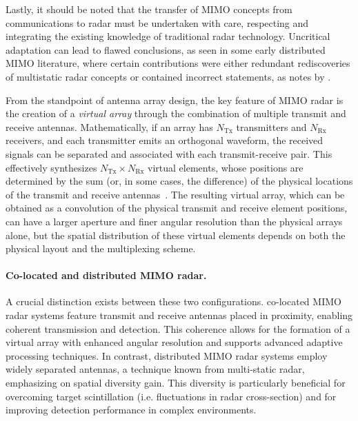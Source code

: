 Lastly, it should be noted that the transfer of MIMO concepts from communications to radar must be undertaken with care, respecting and integrating the existing knowledge of traditional radar technology.
Uncritical adaptation can lead to flawed conclusions, as seen in some early distributed MIMO literature, where certain contributions were either redundant rediscoveries of multistatic radar concepts or contained incorrect statements, as notes by \textcite{chernyakConceptMIMORadar2010}.

From the standpoint of antenna array design, the key feature of MIMO radar is the creation of a \emph{virtual array} through the combination of multiple transmit and receive antennas.
Mathematically, if an array has $N_\mathrm{Tx}$ transmitters and $N_\mathrm{Rx}$ receivers, and each transmitter emits an orthogonal waveform, the received signals can be separated and associated with each transmit-receive pair.
This effectively synthesizes $N_\mathrm{Tx} \times N_\mathrm{Rx}$ virtual elements, whose positions are determined by the sum (or, in some cases, the difference) of the physical locations of the transmit and receive antennas~\parencite{holderSystematicMethodsSynthesis2023}.
The resulting virtual array, which can be obtained as a convolution of the physical transmit and receive element positions, can have a larger aperture and finer angular resolution than the physical arrays alone, but the spatial distribution of these virtual elements depends on both the physical layout and the multiplexing scheme.

\paragraph{Co-located and distributed MIMO radar.}
A crucial distinction exists between these two configurations.
co-located MIMO radar systems feature transmit and receive antennas placed in proximity, enabling coherent transmission and detection.
This coherence allows for the formation of a virtual array with enhanced angular resolution and supports advanced adaptive processing techniques.
In contrast, distributed MIMO radar systems employ widely separated antennas, a technique known from multi-static radar, emphasizing on spatial diversity gain.
This diversity is particularly beneficial for overcoming target scintillation (i.e. fluctuations in radar cross-section) and for improving detection performance in complex environments.

